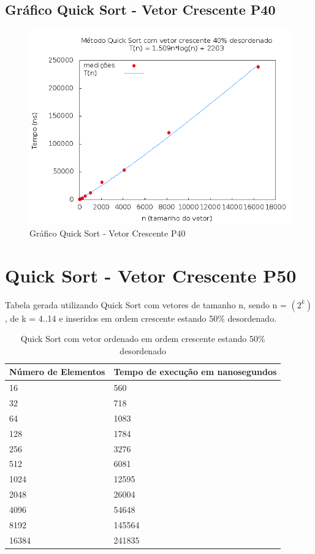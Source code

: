 \documentclass[12pt,a4paper,twoside]{report}
\begin{document}
\subsection{Gráfico Quick Sort - Vetor Crescente P40}
\begin{figure}[H]
    \centering
    \includegraphics[width=0.7\linewidth]{graficos/QuickSort/vIntCrescenteP40/vIntCrescenteP40.png}
  \caption{Gráfico Quick Sort - Vetor Crescente P40}
\end{figure}

\section{Quick Sort - Vetor Crescente P50}
Tabela gerada utilizando Quick Sort com vetores de tamanho n, sendo n = $(2^k)$, de k = 4..14 e inseridos em ordem crescente estando 50\% desordenado.
\begin{table}[H]
\centering
\caption{Quick Sort com vetor ordenado em ordem crescente estando 50\% desordenado}
\label{my-label}
\begin{tabular}{|l|l|}
\hline
\multicolumn{1}{|c|}{\textbf{Número de Elementos}} & \multicolumn{1}{c|}{\textbf{Tempo de execução em nanosegundos}} \\ \hline
16 & 560 \\ \hline
32 & 718 \\ \hline
64 & 1083 \\ \hline
128 & 1784 \\ \hline
256 & 3276 \\ \hline
512 & 6081 \\ \hline
1024 & 12595 \\ \hline
2048 & 26004 \\ \hline
4096 & 54648 \\ \hline
8192 & 145564 \\ \hline
16384 & 241835 \\ \hline
\end{tabular}
\end{table}
\end{document}
